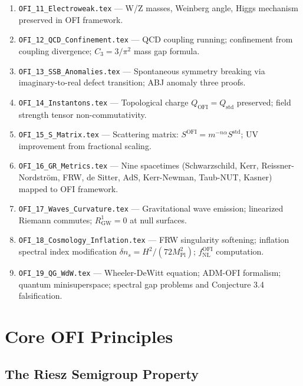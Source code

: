 \documentclass[12pt,a4paper]{article}
\theoremstyle{definition}
\newcommand{\defect}[1]{R^{#1}}
\newcommand{\OFI}{\text{OFI}}
\begin{document}
\begin{enumerate}
\item \texttt{OFI\_11\_Electroweak.tex} — W/Z masses, Weinberg angle, Higgs mechanism preserved in OFI framework.

\item \texttt{OFI\_12\_QCD\_Confinement.tex} — QCD coupling running; confinement from coupling divergence; $C_3 = 3/\pi^2$ mass gap formula.

\item \texttt{OFI\_13\_SSB\_Anomalies.tex} — Spontaneous symmetry breaking via imaginary-to-real defect transition; ABJ anomaly three proofs.

\item \texttt{OFI\_14\_Instantons.tex} — Topological charge $Q_{\OFI} = Q_{\text{std}}$ preserved; field strength tensor non-commutativity.

\item \texttt{OFI\_15\_S\_Matrix.tex} — Scattering matrix: $S^{\OFI} = m^{-n\alpha} S^{\text{std}}$; UV improvement from fractional scaling.

\item \texttt{OFI\_16\_GR\_Metrics.tex} — Nine spacetimes (Schwarzschild, Kerr, Reissner-Nordström, FRW, de Sitter, AdS, Kerr-Newman, Taub-NUT, Kasner) mapped to OFI framework.

\item \texttt{OFI\_17\_Waves\_Curvature.tex} — Gravitational wave emission; linearized Riemann commutes; $\defect{1}_{\text{GW}} = 0$ at null surfaces.

\item \texttt{OFI\_18\_Cosmology\_Inflation.tex} — FRW singularity softening; inflation spectral index modification $\delta n_s = H^2/(72 M_{\text{Pl}}^2)$; $f_{\text{NL}}^{\OFI}$ computation.

\item \texttt{OFI\_19\_QG\_WdW.tex} — Wheeler-DeWitt equation; ADM-OFI formalism; quantum minisuperspace; spectral gap problems and Conjecture 3.4 falsification.
\end{enumerate}

\newpage

\section{Core OFI Principles}

\subsection{The Riesz Semigroup Property}
\end{document}
